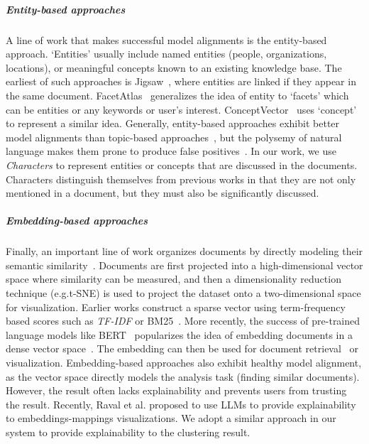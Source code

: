 \subparagraph{Entity-based approaches}
A line of work that makes successful model alignments is the entity-based approach.
`Entities' usually include named entities (people, organizations, locations), or meaningful concepts known to an existing knowledge base.
The earliest of such approaches is Jigsaw~\cite{Stasko2007jigasw}, where entities are linked if they appear in the same document.
FacetAtlas~\cite{cao2010facetatlas} generalizes the idea of entity to `facets' which can be entities or any keywords or user's interest.
ConceptVector~\cite{park2018conceptvector} uses `concept' to represent a similar idea. 
Generally, entity-based approaches exhibit better model alignments than topic-based approaches~\cite{chuang2012interpretation}, 
but the polysemy of natural language makes them prone to produce false positives~\cite{park2018conceptvector}.
In our work, we use \textit{Characters} to represent entities or concepts that are discussed in the documents.
Characters distinguish themselves from previous works in that they are not only mentioned in a document, but they must also be significantly discussed.

\subparagraph{Embedding-based approaches}
Finally, an important line of work organizes documents by directly modeling their semantic similarity~\cite{steinbach2000doccluster}.
Documents are first projected into a high-dimensional vector space where similarity can be measured, and then a dimensionality reduction technique (e.g.t-SNE) is used to project the dataset onto a two-dimensional space for visualization.
Earlier works construct a sparse vector using term-frequency based scores such as \textit{TF-IDF} or BM25~\cite{choo2013utopian,sherkat2018interactive}.
More recently, the success of pre-trained language models like BERT~\cite{devlin2018bert} popularizes the idea of embedding documents in a dense vector space~\cite{narechania2022vitality,tu2023sdrquerier,qiu2022docflow}.
The embedding can then be used for document retrieval~\cite{karpukhin-etal-2020-dense, izacard2022unsupervised} or visualization.
Embedding-based approaches also exhibit healthy model alignment, as the vector space directly models the analysis task (finding similar documents). 
However, the result often lacks explainability and prevents users from trusting the result.
Recently, Raval et al.\cite{raval2023explainandtrust} proposed to use LLMs to provide explainability to embeddings-mappings visualizations.
We adopt a similar approach in our system to provide explainability to the clustering result.

